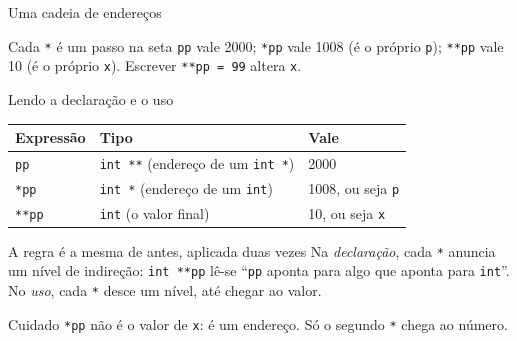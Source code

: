 \documentclass[aspectratio=169]{beamer}
\begin{document}
\begin{frame}{Uma cadeia de endereços}
  \begin{center}
  \end{center}
  \begin{exampleblock}{Cada \texttt{*} é um passo na seta}
    \texttt{pp} vale 2000; \texttt{*pp} vale 1008 (é o próprio \texttt{p});
    \texttt{**pp} vale 10 (é o próprio \texttt{x}). Escrever \texttt{**pp = 99}
    altera \texttt{x}.
  \end{exampleblock}
\end{frame}

\begin{frame}{Lendo a declaração e o uso}
  \begin{center}
  \small
  \begin{tabular}{lll}
    \toprule
    Expressão & Tipo & Vale \\
    \midrule
    \texttt{pp}   & \texttt{int **} (endereço de um \texttt{int *}) & 2000 \\
    \texttt{*pp}  & \texttt{int *}  (endereço de um \texttt{int})   & 1008, ou seja \texttt{p} \\
    \texttt{**pp} & \texttt{int}    (o valor final)                 & 10, ou seja \texttt{x} \\
    \bottomrule
  \end{tabular}
  \end{center}
  \begin{block}{A regra é a mesma de antes, aplicada duas vezes}
    Na \emph{declaração}, cada \texttt{*} anuncia um nível de indireção:
    \texttt{int **pp} lê-se ``\texttt{pp} aponta para algo que aponta para
    \texttt{int}''. No \emph{uso}, cada \texttt{*} desce um nível, até chegar
    ao valor.
  \end{block}
  \begin{alertblock}{Cuidado}
    \texttt{*pp} não é o valor de \texttt{x}: é um endereço. Só o segundo
    \texttt{*} chega ao número.
  \end{alertblock}
\end{frame}
\end{document}
